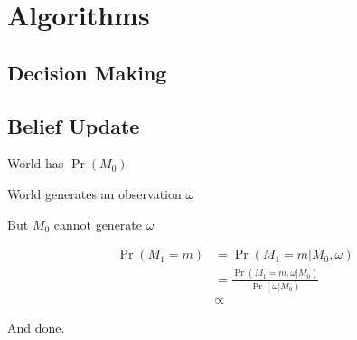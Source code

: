 \documentclass{book}
\begin{document}
\section{Algorithms}

\subsection{Decision Making}

\subsection{Belief Update}

World has $\Pr(M_0)$

World generates an observation $\omega$

But $M_0$ cannot generate $\omega$

\begin{align}
\Pr(M_1=m)&=\Pr(M_1=m|M_0,\omega)\\
&=\frac{\Pr(M_1=m,\omega|M_0)}{\Pr(\omega|M_0)}\\
&\propto 
\end{align}

And done.
\end{document}
